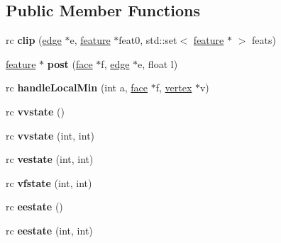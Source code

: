 \subsection*{Public Member Functions}
\begin{DoxyCompactItemize}
\item 
\hypertarget{classvclip_a47c6b5e8cb756ae3c98367e4289ae579}{
rc {\bfseries clip} (\hyperlink{classedge}{edge} $\ast$e, \hyperlink{classfeature}{feature} $\ast$feat0, std::set$<$ \hyperlink{classfeature}{feature} $\ast$ $>$ feats)}
\label{classvclip_a47c6b5e8cb756ae3c98367e4289ae579}

\item 
\hypertarget{classvclip_a85d72aaafaf94ad1d78f8fba090db09a}{
\hyperlink{classfeature}{feature} $\ast$ {\bfseries post} (\hyperlink{classface}{face} $\ast$f, \hyperlink{classedge}{edge} $\ast$e, float l)}
\label{classvclip_a85d72aaafaf94ad1d78f8fba090db09a}

\item 
\hypertarget{classvclip_ad22dc5aa89a0dc4d21b06ea0f4010893}{
rc {\bfseries handleLocalMin} (int a, \hyperlink{classface}{face} $\ast$f, \hyperlink{classvertex}{vertex} $\ast$v)}
\label{classvclip_ad22dc5aa89a0dc4d21b06ea0f4010893}

\item 
\hypertarget{classvclip_a3fd13a780eba1feef27190355c6cec64}{
rc {\bfseries vvstate} ()}
\label{classvclip_a3fd13a780eba1feef27190355c6cec64}

\item 
\hypertarget{classvclip_a94ca5ba594e661086b5aef61ba78ea46}{
rc {\bfseries vvstate} (int, int)}
\label{classvclip_a94ca5ba594e661086b5aef61ba78ea46}

\item 
\hypertarget{classvclip_ac568f740d3e18c9e2c2252008d79e2f2}{
rc {\bfseries vestate} (int, int)}
\label{classvclip_ac568f740d3e18c9e2c2252008d79e2f2}

\item 
\hypertarget{classvclip_a4a79f06e5dec143d2608c8509b736ff0}{
rc {\bfseries vfstate} (int, int)}
\label{classvclip_a4a79f06e5dec143d2608c8509b736ff0}

\item 
\hypertarget{classvclip_a1fefe6460b01ffa8a1424e88a543fdd7}{
rc {\bfseries eestate} ()}
\label{classvclip_a1fefe6460b01ffa8a1424e88a543fdd7}

\item 
\hypertarget{classvclip_afaf4a66a520e05bfda33c27a5dfccdb5}{
rc {\bfseries eestate} (int, int)}
\label{classvclip_afaf4a66a520e05bfda33c27a5dfccdb5}

\end{DoxyCompactItemize}
